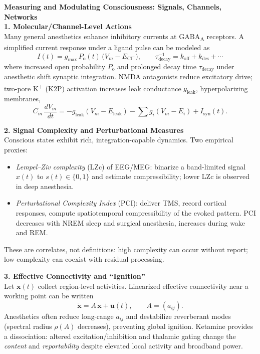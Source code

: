 \begin{technical}
    {\Large\textbf{Measuring and Modulating Consciousness: Signals, Channels, Networks}}\\[0.7em]

    \textbf{1. Molecular/Channel-Level Actions}\\[0.3em]
    Many general anesthetics enhance inhibitory currents at GABA\textsubscript{A} receptors. A simplified current response under a ligand pulse can be modeled as
    \[
        I(t) = g_\text{max}\,P_\text{o}(t)\,\big(V_m - E_{\text{Cl}^-}\big),\qquad
        \tau_\text{decay}^{-1} = k_\text{off} + k_\text{des} + \cdots
    \]
    where increased open probability $P_\text{o}$ and prolonged decay time $\tau_\text{decay}$ under anesthetic shift synaptic integration. NMDA antagonists reduce excitatory drive; two-pore K\textsuperscript{+} (K2P) activation increases leak conductance $g_\text{leak}$, hyperpolarizing membranes,
    \[
        C_m\,\frac{dV_m}{dt} = -g_\text{leak}(V_m-E_\text{leak}) - \sum g_i(V_m-E_i) + I_\text{syn}(t).
    \]

    \textbf{2. Signal Complexity and Perturbational Measures}\\[0.3em]
    Conscious states exhibit rich, integration-capable dynamics. Two empirical proxies:
    \begin{itemize}
        \item \emph{Lempel--Ziv complexity} (LZc) of EEG/MEG: binarize a band-limited signal $x(t)$ to $s(t)\in\{0,1\}$ and estimate compressibility; lower LZc is observed in deep anesthesia.
        \item \emph{Perturbational Complexity Index} (PCI): deliver TMS, record cortical responses, compute spatiotemporal compressibility of the evoked pattern. PCI decreases with NREM sleep and surgical anesthesia, increases during wake and REM.
    \end{itemize}
    These are correlates, not definitions: high complexity can occur without report; low complexity can coexist with residual processing.

    \textbf{3. Effective Connectivity and “Ignition”}\\[0.3em]
    Let $\mathbf{x}(t)$ collect region-level activities. Linearized effective connectivity near a working point can be written
    \[
        \dot{\mathbf{x}} = A\,\mathbf{x} + \mathbf{u}(t),\qquad A = (a_{ij}).
    \]
    Anesthetics often reduce long-range $a_{ij}$ and destabilize reverberant modes (spectral radius $\rho(A)$ decreases), preventing global ignition. Ketamine provides a dissociation: altered excitation/inhibition and thalamic gating change the \emph{content} and \emph{reportability} despite elevated local activity and broadband power.


\end{technical}
